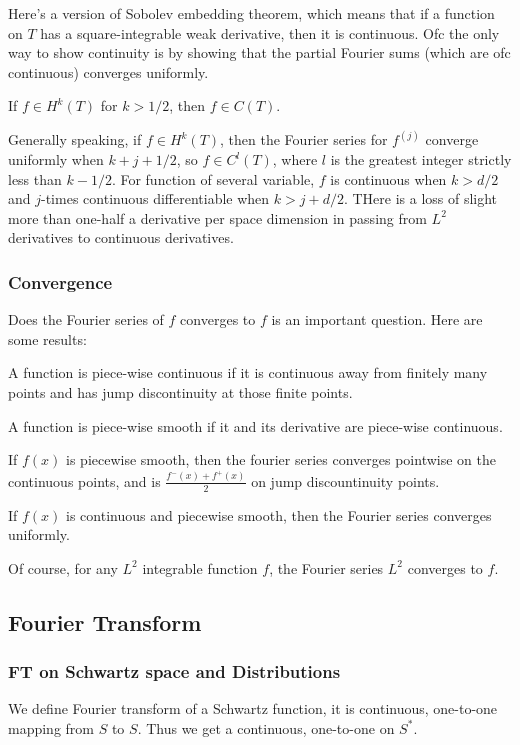 \documentclass[main.tex]{subfiles}
\begin{document}
Here's a version of Sobolev embedding theorem, which means that if a function on $T$ has a square-integrable weak derivative, then it is continuous. Ofc the only way to show continuity is by showing that the partial Fourier sums (which are ofc continuous) converges uniformly.

\begin{theorem}
If $f \in H^k(T)$ for $k > 1/2$, then $f \in C(T)$.
\end{theorem}

Generally speaking, if $f \in H^k(T)$, then the Fourier series for $f^{(j)}$ converge uniformly when $k + j + 1/2$, so $f \in C^l(T)$, where $l$ is the greatest integer strictly less than $k - 1/2$. For function of several variable, $f$ is continuous when $k > d/2$ and $j$-times continuous differentiable when $k > j + d/2$. THere is a loss of slight more than one-half a derivative per space dimension in passing from $L^2$ derivatives to continuous derivatives.

\subsubsection{Convergence}
Does the Fourier series of $f$ converges to $f$ is an important question. Here are some results:

A function is piece-wise continuous if it is continuous away from finitely many points and has jump discontinuity at those finite points.

A function is piece-wise smooth if it and its derivative are piece-wise continuous.
\begin{theorem}
If $f(x)$ is piecewise smooth, then the fourier series converges pointwise on the continuous points, and is $\frac{f^-(x) + f^+(x)}{2}$ on jump discountinuity points.
\end{theorem}

\begin{theorem}
If $f(x)$ is continuous and piecewise smooth, then the Fourier series converges uniformly.
\end{theorem}

Of course, for any $L^2$ integrable function $f$, the Fourier series $L^2$ converges to $f$.

\subsection{Fourier Transform}

\subsubsection{FT on Schwartz space and Distributions}
We define Fourier transform of a Schwartz function, it is continuous, one-to-one mapping from $S$ to $S$. Thus we get a continuous, one-to-one on $S^*$.
\end{document}
